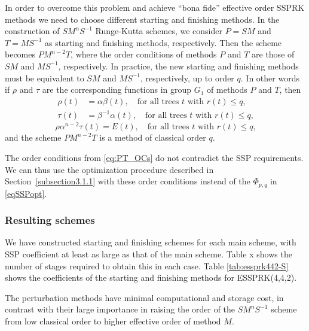 In order to overcome this problem and achieve ``bona fide'' effective order SSPRK methods we need to choose different starting and finishing methods. In the construction of \( SM^{n}S^{-1} \) Runge-Kutta schemes, we consider \( P = SM \) and \( T = MS^{-1} \) as starting and finishing methods, respectively. Then the scheme becomes \( PM^{n-2}T \), where the order conditions of methods \( P \) and \( T \) are those of \( SM \) and \( MS^{-1} \), respectively.
In practice, the new starting and finishing methods must be equivalent to \( SM \) and \( MS^{-1} \), respectively, up to order $q$.
 In other words if \( \rho \) and \( \tau \) are the corresponding functions in group $G_1$ of methods \( P \) and \( T \), then
\begin{subequations} \label{eq:PT_OCs}
\begin{align}
    \rho(t) &= \alpha\beta(t), \quad \text{for all trees $t$ with $r(t) \leq q$,} \\
    \tau(t) &= \beta^{-1}\alpha(t), \quad \text{for all trees $t$ with $r(t) \leq q$,}
\end{align}
\end{subequations}
$$
    \rho\alpha^{n-2}\tau(t) = E(t), \quad \text{for all trees $t$ with $r(t) \leq q$,}
$$
and the scheme \( PM^{n-2}T \) is a method of classical order \( q \).

The order conditions from \eqref{eq:PT_OCs} do not contradict the SSP
requirements.  We can thus use the optimization procedure described in
Section~\ref{subsection3.1.1} with these order conditions instead of
the $\Phi_{p,q}$ in \eqref{eqSSPopt}. 

\subsubsection{Resulting schemes}
We have constructed starting and finishing schemes for each main scheme,
with SSP coefficient at least as large as that of the main scheme.
Table x shows the number of stages required to obtain this in each case.
Table \ref{tab:essprk442-S} shows the coefficients of the starting and finishing methods for 
ESSPRK(4,4,2).

The perturbation methods have minimal computational and storage cost, in
contrast with their large importance in raising the order of the \(
SM^{n}S^{-1} \) scheme from low classical order to higher effective order of
method \( M \).

